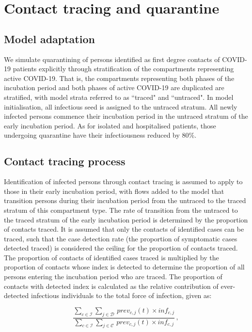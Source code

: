 \section{Contact tracing and quarantine}

\subsection{Model adaptation}
We simulate quarantining of persons identified as first degree contacts of COVID-19 patients explicitly through stratification of the compartments representing active COVID-19.
That is, the compartments representing both phases of the incubation period and both phases of active COVID-19 are duplicated are stratified, with model strata referred to as ``traced" and ``untraced".
In model initialisation, all infectious seed is assigned to the untraced stratum.
All newly infected persons commence their incubation period in the untraced stratum of the early incubation period.
As for isolated and hospitalised patients, those undergoing quarantine have their infectiousness reduced by 80\%.

\subsection{Contact tracing process}
Identification of infected persons through contact tracing is assumed to apply to those in their early incubation period, with flows added to the model that transition persons during their incubation period from the untraced to the traced stratum of this compartment type.
The rate of transition from the untraced to the traced stratum of the early incubation period is determined by the proportion of contacts traced.
It is assumed that only the contacts of identified cases can be traced, such that the case detection rate (the proportion of symptomatic cases detected traced) is considered the ceiling for the proportion of contacts traced.
The proportion of contacts of identified cases traced is multiplied by the proportion of contacts whose index is detected to determine the proportion of all persons entering the incubation period who are traced.
The proportion of contacts with detected index is calculated as the relative contribution of ever-detected infectious individuals to the total force of infection, given as:

\[ \frac
{\sum_{c \in \mathcal{I}} \sum_{j \in \mathcal{D}} \, prev_{c, j}(t) \times inf_{c, j}}
{\sum_{c \in \mathcal{I}} \sum_{j \in \mathcal{C}} \, prev_{c, j}(t) \times inf_{c, j}} \, ,
\]

